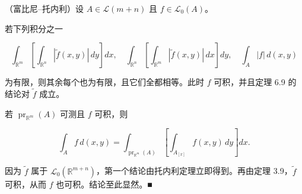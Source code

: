 \begin{theorem}

（富比尼–托内利）设 $ A \in \mathcal{L}(m+n) $ 且 $ f \in \mathcal{L}_{0}(A) $。

\begin{subitems}
\item

若下列积分之一

\[
\int_{\mathbb{R}^m} \left[ \int_{\mathbb{R}^n} |\tilde{f}(x, y)| \, dy \right] dx , \quad \int_{\mathbb{R}^n} \left[ \int_{\mathbb{R}^m} |\tilde{f}(x, y)| \, dx \right] dy , \quad \int_{A} |f| \, d(x, y)
\]

为有限，则其余每个也为有限，且它们全都相等。此时 $ f $ 可积，并且定理 6.9 的结论对 $ \tilde{f} $ 成立。

\item

若 $ \operatorname{pr}_{\mathbb{R}^m}(A) $ 可测且 $ f $ 可积，则

\[
\int_A f\,d(x,y) = \int_{\operatorname{pr}_{\mathbb{R}^m}(A)}\left[\int_{A_{[x]}} f(x,y)\,dy\right]dx .
\]

\proofhead
因为 $ \widetilde{f} $ 属于 $ \mathcal{L}_0(\mathbb{R}^{m+n}) $，第一个结论由托内利定理立即得到。再由定理 3.9，$ \widetilde{f} $ 可积，从而 $ f $ 也可积。结论至此显然。\nobreak\hspace{0.35em}■
\end{subitems}

\end{theorem}

